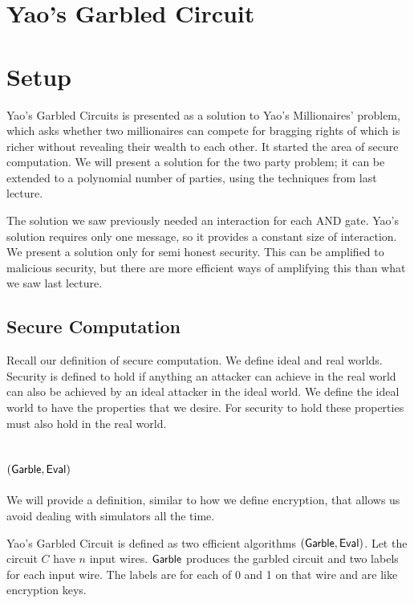 \documentclass[12pt]{tufte-book}
\newcommand{\Eval}{\mathsf{Eval}}
\begin{document}
\section{Yao's Garbled Circuit}




\section{Setup}


Yao's Garbled Circuits is presented as a solution to Yao's Millionaires' problem, 
which asks whether 
two millionaires can compete for bragging rights of which is richer
without revealing their wealth to each other. 
It started the area of secure computation. 
We will present a solution for the two party problem;
it can be extended to a polynomial number of parties,
using the techniques from last lecture.

The solution we saw previously needed an interaction for each AND gate.
Yao's solution requires only one message,
so it provides a constant size of interaction.
We present a solution only for semi honest security. 
This can be amplified to malicious security, 
but there are more efficient ways of amplifying this than what we saw last lecture.

\subsection{Secure Computation}

Recall our definition of secure computation. 
We define ideal and real worlds. 
Security is defined to hold if 
anything an attacker can achieve in the real world 
 can also be achieved by an ideal attacker in the ideal world. 
We define the ideal world to have the properties that we desire. 
For security to hold these properties must also hold in the real world.

\subsection{$(\Garble, \Eval)$}
We will provide a definition, similar to how we define encryption, that allows us avoid dealing with simulators all the time. 


Yao's Garbled Circuit is defined as two efficient algorithms $(\Garble, \Eval)$. Let the circuit $C$ have $n$ input wires.
$\mathsf{Garble}$ produces the garbled circuit and two labels for each input wire. The labels are for each of 0 and 1 on that wire and are like encryption keys. 
\end{document}
